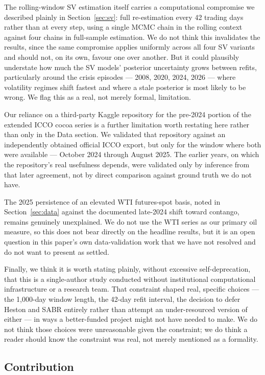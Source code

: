 \documentclass[preprint,12pt,authoryear]{elsarticle}
\begin{document}
The rolling-window SV estimation itself carries a computational compromise we described plainly in Section~\ref{sec:sv}: full re-estimation every 42 trading days rather than at every step, using a single MCMC chain in the rolling context against four chains in full-sample estimation. We do not think this invalidates the results, since the same compromise applies uniformly across all four SV variants and should not, on its own, favour one over another. But it could plausibly understate how much the SV models' posterior uncertainty grows between refits, particularly around the crisis episodes --- 2008, 2020, 2024, 2026 --- where volatility regimes shift fastest and where a stale posterior is most likely to be wrong. We flag this as a real, not merely formal, limitation.

Our reliance on a third-party Kaggle repository for the pre-2024 portion of the extended ICCO cocoa series is a further limitation worth restating here rather than only in the Data section. We validated that repository against an independently obtained official ICCO export, but only for the window where both were available --- October 2024 through August 2025. The earlier years, on which the repository's real usefulness depends, were validated only by inference from that later agreement, not by direct comparison against ground truth we do not have.

The 2025 persistence of an elevated WTI futures-spot basis, noted in Section~\ref{sec:data} against the documented late-2024 shift toward contango, remains genuinely unexplained. We do not use the WTI series as our primary oil measure, so this does not bear directly on the headline results, but it is an open question in this paper's own data-validation work that we have not resolved and do not want to present as settled.

Finally, we think it is worth stating plainly, without excessive self-deprecation, that this is a single-author study conducted without institutional computational infrastructure or a research team. That constraint shaped real, specific choices --- the 1,000-day window length, the 42-day refit interval, the decision to defer Heston and SABR entirely rather than attempt an under-resourced version of either --- in ways a better-funded project might not have needed to make. We do not think those choices were unreasonable given the constraint; we do think a reader should know the constraint was real, not merely mentioned as a formality.

\subsection{Contribution}
\end{document}
